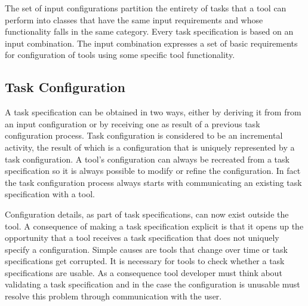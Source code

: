 \documentclass{article}
\begin{document}
   The set of input configurations partition the entirety of tasks that a tool
   can perform into classes that have the same input requirements and whose
   functionality falls in the same category. Every task specification is based
   on an input combination. The input combination expresses a set of basic
   requirements for configuration of tools using some specific tool
   functionality.
   

  \subsection{Task Configuration} \label{ss::task_configuration}


   A task specification can be obtained in two ways, either by deriving it from
   from an input configuration or by receiving one as result of a previous task
   configuration process. Task configuration is considered to be an incremental
   activity, the result of which is a configuration that is uniquely
   represented by a task configuration. A tool's configuration can always be
   recreated from a task specification so it is always possible to modify or
   refine the configuration. In fact the task configuration process always
   starts with communicating an existing task specification with a tool.
   
   Configuration details, as part of task specifications, can now exist outside
   the tool.  A consequence of making a task specification explicit is that it
   opens up the opportunity that a tool receives a task specification that does
   not uniquely specify a configuration. Simple causes are tools that change
   over time or task specifications get corrupted.  It is necessary for tools
   to check whether a task specifications are usable.  As a consequence tool
   developer must think about validating a task specification and in the case
   the configuration is unusable must resolve this problem through
   communication with the user.
\end{document}
